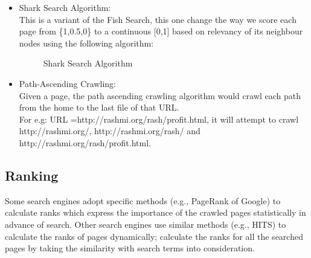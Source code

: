 \documentclass{article}
\begin{document}
\begin{itemize}
        

    \item Shark Search Algorithm:\\
        This is a variant of the Fish Search, this one change the way we score each page from \{1,0.5,0\} to a continuous [0,1] based on relevancy of its neighbour nodes using the following algorithm:\\
        \begin{figure}[H]
           \begin{center}
            \caption{Shark Search Algorithm}
\label{fig:shark_search}
\end{center}
        \end{figure}

    \item Path-Ascending Crawling:\\
        Given a page, the path ascending crawling algorithm would crawl each path from the home to the last file of that URL.\\
        For e.g: URL =http://rashmi.org/rash/profit.html, it will attempt to crawl http://rashmi.org/, http://rashmi.org/rash/ and http://rashmi.org/rash/profit.html.

\end{itemize}

\subsection{Ranking}
Some search engines adopt specific methods (e.g., PageRank of Google) to calculate ranks which express the importance of the crawled pages statistically in advance of search. Other search engines use similar methods (e.g., HITS) to calculate the ranks of pages dynamically; calculate the ranks for all the searched pages by
taking the similarity with search terms into consideration.
\end{document}
